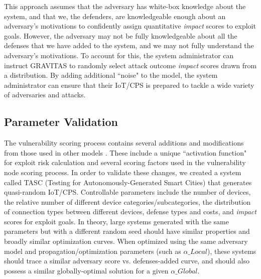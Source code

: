 \documentclass[10pt,journal,compsoc]{IEEEtran}
\begin{document}
\par This approach assumes that the adversary has white-box knowledge about the system, and that we, the defenders, are knowledgeable enough about an adversary's motivations to confidently assign quantitative \textit{impact} scores to exploit goals. However, the adversary may not be fully knowledgeable about all the defenses that we have added to the system, and we may not fully understand the adversary's motivations. To account for this, the system administrator can instruct GRAVITAS to randomly select attack outcome \textit{impact} scores drawn from a distribution. By adding additional ``noise" to the model, the system administrator can ensure that their IoT/CPS is prepared to tackle a wide variety of adversaries and attacks.

\subsection{Parameter Validation}
\label{subsection:parameter_validation}

The vulnerability scoring process contains several additions and modifications from those used
in other models \cite{first2019specification, ur-rehman2019}. These include a unique ``activation function" for exploit risk calculation and several scoring factors used in the vulnerability node scoring process. In order to validate these changes, we created a system called TASC 
(Testing for Autonomously-Generated Smart Cities) that generates quasi-random IoT/CPS. Controllable 
parameters include the number of devices, the relative number of different device 
categories/subcategories, the distribution of connection types between different devices, defense 
types and costs, and \textit{impact} scores for exploit goals. In theory, large systems generated with the 
same parameters but with a different random seed should have similar properties and broadly similar 
optimization curves. When optimized using the same adversary model and propagation/optimization 
parameters (such as $\alpha\_Local$), these systems should trace a similar adversary score 
vs. defenses-added curve, and should also possess a similar globally-optimal solution for a given 
$\alpha\_Global$.
\end{document}
